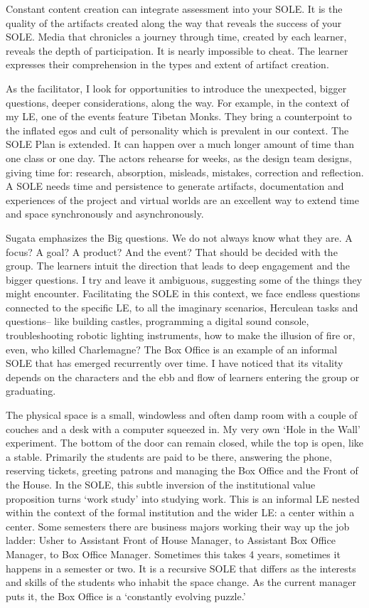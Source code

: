 Constant content creation can integrate assessment into your SOLE. It is
the quality of the artifacts created along the way that reveals the
success of your SOLE. Media that chronicles a journey through time,
created by each learner, reveals the depth of participation. It is
nearly impossible to cheat. The learner expresses their comprehension in
the types and extent of artifact creation.

As the facilitator, I look for opportunities to introduce the
unexpected, bigger questions, deeper considerations, along the way. For
example, in the context of my LE, one of the events feature Tibetan
Monks. They bring a counterpoint to the inflated egos and cult of
personality which is prevalent in our context. The SOLE Plan is
extended. It can happen over a much longer amount of time than one class
or one day. The actors rehearse for weeks, as the design team designs,
giving time for: research, absorption, misleads, mistakes, correction
and reflection. A SOLE needs time and persistence to generate artifacts,
documentation and experiences of the project and virtual worlds are an
excellent way to extend time and space synchronously and asynchronously.

Sugata emphasizes the Big questions. We do not always know what they
are. A focus? A goal? A product? And the event? That should be decided
with the group. The learners intuit the direction that leads to deep
engagement and the bigger questions. I try and leave it ambiguous,
suggesting some of the things they might encounter. Facilitating the
SOLE in this context, we face endless questions connected to the
specific LE, to all the imaginary scenarios, Herculean tasks and
questions-- like building castles, programming a digital sound console,
troubleshooting robotic lighting instruments, how to make the illusion
of fire or, even, who killed Charlemagne? The Box Office is an example
of an informal SOLE that has emerged recurrently over time. I have
noticed that its vitality depends on the characters and the ebb and flow
of learners entering the group or graduating.

The physical space is a small, windowless and often damp room with a couple
of couches and a desk with a computer squeezed in. My very own `Hole in
the Wall' experiment. The bottom of the door can remain closed, while
the top is open, like a stable. Primarily the students are paid to be
there, answering the phone, reserving tickets, greeting patrons and
managing the Box Office and the Front of the House. In the SOLE, this
subtle inversion of the institutional value proposition turns `work
study' into studying work. This is an informal LE nested within the
context of the formal institution and the wider LE: a center within a
center. Some semesters there are business majors working their way up
the job ladder: Usher to Assistant Front of House Manager, to Assistant
Box Office Manager, to Box Office Manager. Sometimes this takes 4 years,
sometimes it happens in a semester or two. It is a recursive SOLE that
differs as the interests and skills of the students who inhabit the
space change. As the current manager puts it, the Box Office is a
`constantly evolving puzzle.'

